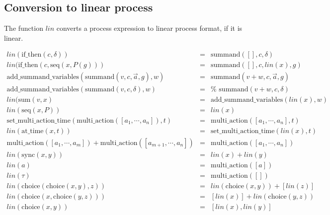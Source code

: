 \documentclass{article}
\begin{document}
\subsection{Conversion to linear process}

The function $lin$ converts a process expression to linear process format,
if it is linear.

\begin{eqnarray*}
lin(\text{if\_then}(c,\delta )) &=&\text{summand}([],c,\delta ) \\
lin(\text{if\_then}(c,\text{seq}(x,P(g))) &=&\text{summand}([],c,lin(x),g) \\
\text{add\_summand\_variables}(\text{summand}(v,c,\overrightarrow{a},g),w)
&=&\text{summand}(v+w,c,\overrightarrow{a},g) \\
\text{add\_summand\_variables}(\text{summand}(v,c,\delta ),w) &=&\text{%
summand}(v+w,c,\delta ) \\
lin(\text{sum}(v,x) &=&\text{add\_summand\_variables}(lin(x),w) \\
lin(\text{seq}(x,P)) &=&lin(x) \\
\text{set\_multi\_action\_time}(\text{multi\_action}([a_{1},\cdots
,a_{n}]),t) &=&\text{multi\_action}([a_{1},\cdots ,a_{n}],t) \\
lin(\text{at\_time}(x,t)) &=&\text{set\_multi\_action\_time}(lin(x),t) \\
\text{multi\_action}([a_{1},\cdots ,a_{m}])+\text{multi\_action}%
([a_{m+1},\cdots ,a_{n}]) &=&\text{multi\_action}([a_{1},\cdots ,a_{n}]) \\
lin(\text{sync}(x,y)) &=&lin(x)+lin(y) \\
lin(a) &=&\text{multi\_action}([a]) \\
lin(\tau ) &=&\text{multi\_action}([]) \\
lin(\text{choice}(\text{choice}(x,y),z)) &=&lin(\text{choice}(x,y))+[lin(z)]
\\
lin(\text{choice}(x,\text{choice}(y,z))) &=&[lin(x)]+lin(\text{choice}(y,z))
\\
lin(\text{choice}(x,y)) &=&[lin(x),lin(y)]
\end{eqnarray*}
\end{document}
